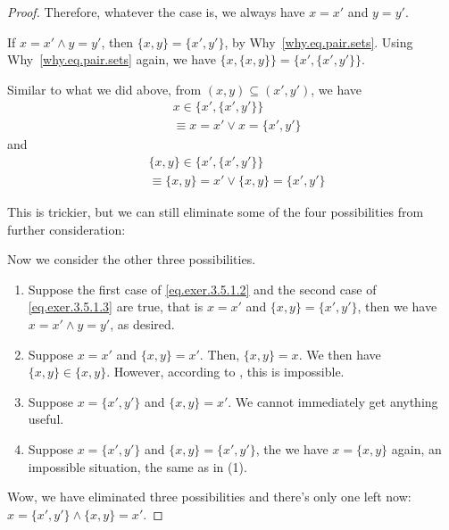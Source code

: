 \begin{proof}
	Therefore, whatever the case is, we always have $x = x'$ and $y = y'$.
	
	 If $x = x' \wedge y = y'$, then $\{x,y\} = \{x',y'\}$, by Why~\ref{why.eq.pair.sets}. Using Why~\ref{why.eq.pair.sets} again, we have $\{x, \{x,y\}\} = \{x', \{x',y'\}\}$.
	
	 Similar to what we did above, from $(x,y) \subseteq (x',y')$, we have
	\begin{equation}\label{eq.exer.3.5.1.2}
	\begin{aligned}
		&x \in \{x', \{x',y'\}\} \\
		&\equiv x = x' \vee x = \{x',y'\}
	\end{aligned}
	\end{equation}
	and
	\begin{equation}\label{eq.exer.3.5.1.3}
	\begin{aligned}
		&\{x,y\} \in \{x', \{x',y'\}\} \\
		&\equiv \{x,y\} = x' \vee \{x,y\} = \{x',y'\}
	\end{aligned}
	\end{equation}

	This is trickier, but we can still eliminate some of the four possibilities from further consideration: 
	
	Now we consider the other three possibilities.
	\begin{enumerate}
		\item Suppose the first case of \eqref{eq.exer.3.5.1.2} and the second case of \eqref{eq.exer.3.5.1.3} are true, that is $x = x'$ and $\{x,y\} = \{x',y'\}$, then we have $x = x' \wedge y = y'$, as desired.
		
		\item Suppose $x = x'$ and $\{x,y\} = x'$. Then, $\{x,y\} = x$. We then have $\{x,y\} \in \{x,y\}$. However, according to , this is impossible.
		
		\item Suppose $x = \{x',y'\}$ and $\{x,y\} = x'$. We cannot immediately get anything useful.
		
		\item Suppose $x = \{x',y'\}$ and $\{x,y\} = \{x',y'\}$, the we have $x = \{x,y\}$ again, an impossible situation, the same as in (1).
	\end{enumerate}

	Wow, we have eliminated three possibilities and there's only one left now: $x = \{x',y'\} \wedge \{x,y\} = x'$.


\end{proof}
